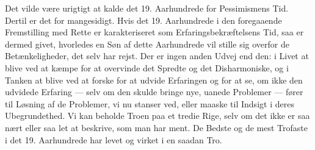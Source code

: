 \documentclass[12pt,a4paper,openany]{book}
\begin{document}
Det vilde være urigtigt at kalde det 19. Aarhundrede for Pessimismens
Tid. Dertil er det for mangesidigt. Hvis det 19. Aarhundrede
i den foregaaende Fremstilling med Rette er karakteriseret som Erfaringsbekræftelsens
Tid, saa er dermed givet, hvorledes en Søn af
dette Aarhundrede vil stille sig overfor de Betænkeligheder, det selv
har rejst. Der er ingen anden Udvej end den: i Livet at blive ved at
kæmpe for at overvinde det Spredte og det Disharmoniske, og i
Tanken at blive ved at forske for at udvide Erfaringen og for at se,
om ikke den udvidede Erfaring --- selv om den skulde bringe nye,
uanede Problemer --- fører til Løsning af de Problemer, vi nu stanser
ved, eller maaske til Indsigt i deres Ubegrundethed. Vi kan beholde
Troen paa et tredie Rige, selv om det ikke er saa nært eller
saa let at beskrive, som man har ment. De Bedste og de mest Trofaste
i det 19. Aarhundrede har levet og virket i en saadan Tro.
\end{document}
